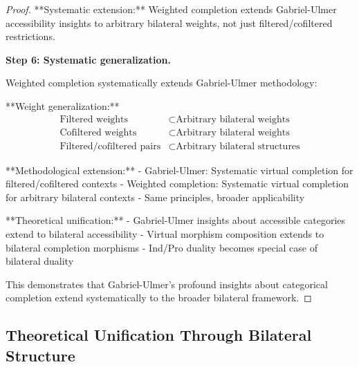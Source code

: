 \documentclass[11pt]{article}
\theoremstyle{plain}
\theoremstyle{definition}
\theoremstyle{remark}
\begin{document}
\begin{proof}
**Systematic extension:** Weighted completion extends Gabriel-Ulmer accessibility insights to arbitrary bilateral weights, not just filtered/cofiltered restrictions.

\textbf{Step 6: Systematic generalization.}

Weighted completion systematically extends Gabriel-Ulmer methodology:

**Weight generalization:**
\begin{align}
\text{Filtered weights} &\subset \text{Arbitrary bilateral weights} \\
\text{Cofiltered weights} &\subset \text{Arbitrary bilateral weights} \\
\text{Filtered/cofiltered pairs} &\subset \text{Arbitrary bilateral structures}
\end{align}

**Methodological extension:**
- Gabriel-Ulmer: Systematic virtual completion for filtered/cofiltered contexts
- Weighted completion: Systematic virtual completion for arbitrary bilateral contexts
- Same principles, broader applicability

**Theoretical unification:**
- Gabriel-Ulmer insights about accessible categories extend to bilateral accessibility
- Virtual morphism composition extends to bilateral completion morphisms
- Ind/Pro duality becomes special case of bilateral duality

This demonstrates that Gabriel-Ulmer's profound insights about categorical completion extend systematically to the broader bilateral framework.
\end{proof}

\subsection{Theoretical Unification Through Bilateral Structure}
\end{document}
